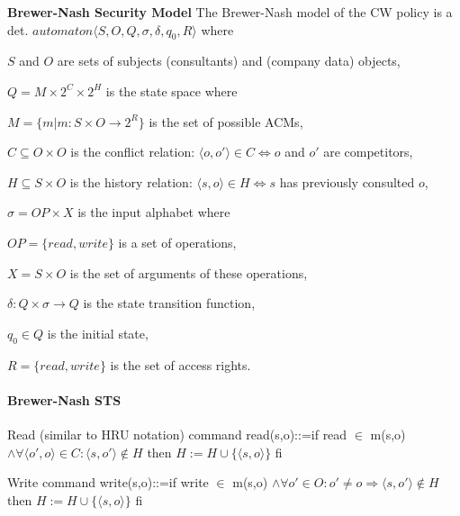 \documentclass[a4paper]{article}
\renewcommand{\note}[2]{\begin{noteBox} \textbf{#1} #2 \end{noteBox}}
\begin{document}
\begin{multicols}{3}
    \note{Brewer-Nash Security Model}{The Brewer-Nash model of the CW policy is a det. $automaton\langle S,O,Q,\sigma,\delta,q_0,R\rangle$ where
        \begin{itemize*}
            \item $S$ and $O$ are sets of subjects (consultants) and (company data) objects,
            \item $Q=M\times 2^C\times 2^H$ is the state space where
            \begin{itemize*}
                \item $M=\{m|m:S\times O\rightarrow 2^R\}$ is the set of possible ACMs,
                \item $C\subseteq O\times O$ is the conflict relation: $\langle o,o'\rangle \in C\Leftrightarrow o$ and $o'$ are competitors,
                \item $H\subseteq S\times O$ is the history relation: $\langle s,o\rangle \in H\Leftrightarrow s$ has previously
                consulted $o$,
            \end{itemize*}
            \item $\sigma=OP \times X$ is the input alphabet where
            \begin{itemize*}
                \item $OP=\{read,write\}$ is a set of operations,
                \item $X=S \times O$ is the set of arguments of these operations,
            \end{itemize*}
            \item $\delta:Q \times\sigma\rightarrow Q$ is the state transition function,
            \item $q_0\in Q$ is the initial state,
            \item $R=\{read,write\}$ is the set of access rights.
        \end{itemize*}
    }

    \paragraph{Brewer-Nash STS}
    \begin{itemize*}
        \item Read (similar to HRU notation)
        command read(s,o)::=if read $\in$ m(s,o) $\wedge\forall \langle o',o\rangle \in C:\langle s,o'\rangle \not\in H$
        then
        $H:=H\cup\{\langle s,o\rangle \}$
        fi
        \item Write
        command write(s,o)::=if write $\in$ m(s,o) $\wedge\forall o'\in O:o'\not=o \Rightarrow \langle s,o'\rangle \not\in H$
        then
        $H:=H\cup\{\langle s,o\rangle \}$
        fi
    \end{itemize*}


\end{multicols}
\end{document}
